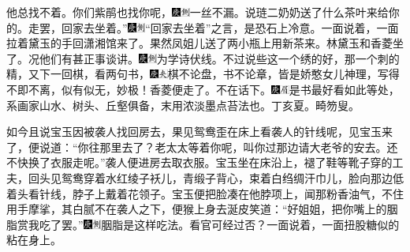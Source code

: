 他总找不着。你们紫鹃也找你呢，{\includegraphics[width=3mm]{../Images/00004}\includegraphics[width=3mm]{../Images/00011}\footnotesize \kaishu 一丝不漏。}说琏二奶奶送了什么茶叶来给你的。走罢，回家去坐着。''{\includegraphics[width=3mm]{../Images/00004}\includegraphics[width=3mm]{../Images/00011}\footnotesize \kaishu ``回家去坐着''之言，是恐石上冷意。}一面说着，一面拉着黛玉的手回潇湘馆来了。果然凤姐儿送了两小瓶上用新茶来。林黛玉和香菱坐了。况他们有甚正事谈讲。{\includegraphics[width=3mm]{../Images/00004}\includegraphics[width=3mm]{../Images/00011}\footnotesize \kaishu 为学诗伏线。}不过说些这一个绣的好，那一个刺的精，又下一回棋，看两句书，{\includegraphics[width=3mm]{../Images/00004}\includegraphics[width=3mm]{../Images/00012}\footnotesize \kaishu 棋不论盘，书不论章，皆是娇憨女儿神理，写得不即不离，似有似无，妙极！}香菱便走了。不在话下。{\includegraphics[width=3mm]{../Images/00004}\includegraphics[width=3mm]{../Images/00010}\footnotesize \kaishu 是书最好看如此等处，系画家山水、树头、丘壑俱备，末用浓淡墨点苔法也。丁亥夏。畸笏叟。}

如今且说宝玉因被袭人找回房去，果见鸳鸯歪在床上看袭人的针线呢，见宝玉来了，便说道：``你往那里去了？老太太等着你呢，叫你过那边请大老爷的安去。还不快换了衣服走呢。''袭人便进房去取衣服。宝玉坐在床沿上，褪了鞋等靴子穿的工夫，回头见鸳鸯穿着水红绫子袄儿，青缎子背心，束着白绉绸汗巾儿，脸向那边低着头看针线，脖子上戴着花领子。宝玉便把脸凑在他脖项上，闻那粉香油气，不住用手摩挲，其白腻不在袭人之下，便猴上身去涎皮笑道：``好姐姐，把你嘴上的胭脂赏我吃了罢。''{\includegraphics[width=3mm]{../Images/00004}\includegraphics[width=3mm]{../Images/00011}\footnotesize \kaishu 胭脂是这样吃法。看官可经过否？}一面说着，一面扭股糖似的粘在身上。

